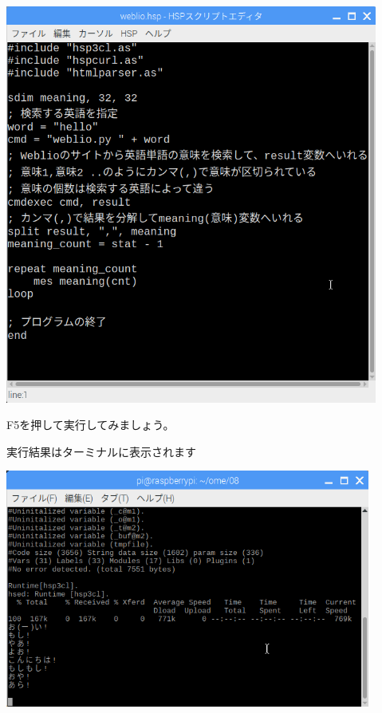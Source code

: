 \documentclass[a4paper,12pt,dvipdfmx]{jarticle}
\begin{document}
\begin{center}
\includegraphics[width=12.243cm,height=13.139cm]{textbook-img047.png}

\end{center}


\bigskip


\bigskip

F5を押して実行してみましょう。

実行結果はターミナルに表示されます



\begin{center}
\includegraphics[width=12.012cm,height=7.825cm]{textbook-img048.png}

\end{center}
\end{document}
